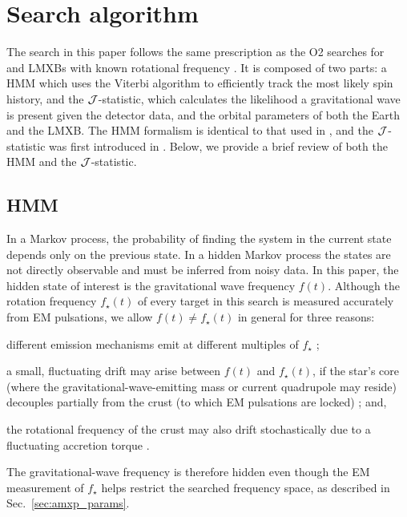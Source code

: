\section{Search algorithm \label{sec:amxp_alg}}
The search in this paper follows the same prescription as the O2 searches for \sco\ \cite{o2vitsco} and LMXBs with known rotational frequency \cite{Middleton2020}. It is composed of two parts: a HMM which uses the Viterbi algorithm to efficiently track the most likely spin history, and the $\mathcal{J}$-statistic, which calculates the likelihood a gravitational wave is present given the detector data, and the orbital parameters of both the Earth and the LMXB. The HMM formalism is identical to that used in \citet{Suvorova2016, o1vitsco, Suvorova2017, o2vitsco, Middleton2020}, and the $\mathcal{J}$-statistic was first introduced in \citet{Suvorova2017}. Below, we provide a brief review of both the HMM and the $\mathcal{J}$-statistic.
 
\subsection{HMM\label{sec:amxp_hmm}} 
In a Markov process, the probability of finding the system in the current state depends only on the previous state. In a hidden Markov process the states are not directly observable and must be inferred from noisy data. In this paper, the hidden state of interest is the gravitational wave frequency $f(t)$. Although the rotation frequency $f_\star(t)$ of every target in this search is measured accurately from EM pulsations, we allow $f(t) \neq f_\star(t)$ in general for three reasons:
\begin{enumerate*} \item different emission mechanisms emit at different multiples of $f_\star$ \cite{Riles2013a};
\item a small, fluctuating drift may arise between $f(t)$ and $f_\star(t)$, if the star's core (where the gravitational-wave-emitting mass or current quadrupole may reside) decouples partially from the crust (to which EM pulsations are locked) \cite{Suvorova2016, s5crab}; and,
\item the rotational frequency of the crust may also drift stochastically due to a fluctuating accretion torque \cite{Mukherjee2018, Patruno2021}.
\end{enumerate*}
The gravitational-wave frequency is therefore hidden even though the EM measurement of $f_\star$ helps restrict the searched frequency space, as described in Sec.~\ref{sec:amxp_params}.

